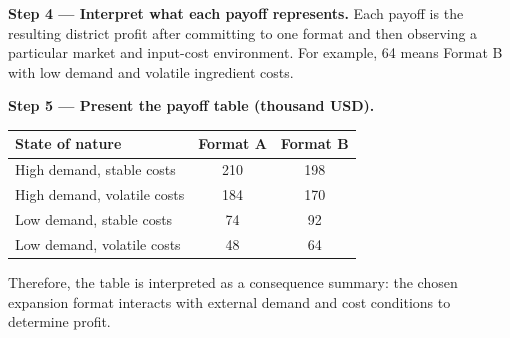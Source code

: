 \begin{ExamProblems}
		\textbf{Step 4 --- Interpret what each payoff represents.} Each payoff is the resulting district profit after committing to one format and then observing a particular market and input-cost environment. For example, 64 means Format B with low demand and volatile ingredient costs.
		
		\textbf{Step 5 --- Present the payoff table (thousand USD).}
		\begin{center}
			\begin{tabular}{l c c}
				\toprule
				State of nature & Format A & Format B \\
				\midrule
				High demand, stable costs & 210 & 198 \\
				High demand, volatile costs & 184 & 170 \\
				Low demand, stable costs & 74 & 92 \\
				Low demand, volatile costs & 48 & 64 \\
				\bottomrule
			\end{tabular}
		\end{center}
		
		Therefore, the table is interpreted as a consequence summary: the chosen expansion format interacts with external demand and cost conditions to determine profit.
	\end{ExamProblems}

